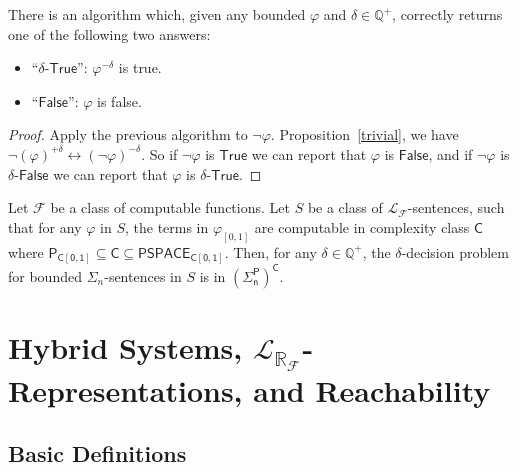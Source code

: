 \documentclass[envcountsect]{llncs}
\newcommand{\lrf}{\mathcal{L}_{\mathbb{R}_{\mathcal{F}}}}
\begin{document}
\begin{corollary}
There is an algorithm which, given any bounded $\varphi$ and $\delta\in \mathbb{Q}^+$, correctly returns one of the following two answers:
\begin{itemize}
\item ``$\delta$-$\mathsf{True}$'': $\varphi^{-\delta}$ is true. 
\item ``$\mathsf{False}$'': $\varphi$ is false. 
\end{itemize} 
\end{corollary}

\begin{proof}
Apply the previous algorithm to $\neg\varphi$. Proposition~\ref{trivial}, we have $\neg(\varphi)^{+\delta}\leftrightarrow (\neg\varphi)^{-\delta}$. So if $\neg\varphi$ is $\mathsf{True}$ we can report that $\varphi$ is $\mathsf{False}$, and if $\neg\varphi$ is $\delta$-$\mathsf{False}$ we can report that $\varphi$ is $\delta$-$\mathsf{True}$.
\end{proof}

\begin{theorem}\label{compmain}
Let $\mathcal{F}$ be a class of computable functions. Let $S$ be a class of $\mathcal{L}_{\mathcal{F}}$-sentences, such that for any $\varphi$ in $S$, the terms in $\varphi_{[0,1]}$ are computable in complexity class $\mathsf{C}$ where $\mathsf{P_{C[0,1]}\subseteq \mathsf{C}\subseteq \mathsf{PSPACE_{C[0,1]}}}$. Then, for any $\delta\in \mathbb{Q}^+$, the $\delta$-decision problem for bounded $\Sigma_n$-sentences in $S$ is in $\mathsf{(\Sigma_n^P)^C}$.
\end{theorem}


\section{Hybrid Systems, $\lrf$-Representations, and Reachability}

\subsection{Basic Definitions}
\end{document}
